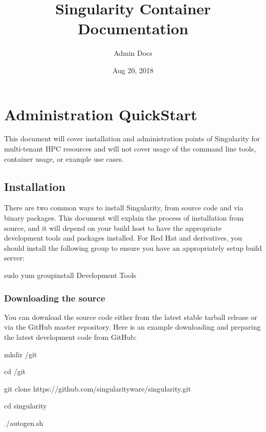\documentclass[letterpaper,10pt,english]{sphinxmanual}
\title{Singularity Container Documentation}
\date{Aug 20, 2018}
\author{Admin Docs}
\begin{document}
\maketitle
\sphinxtableofcontents
{}\label{\detokenize{index::doc}}



\chapter{Administration QuickStart}
\label{\detokenize{admin_quickstart:administration-quickstart}}\label{\detokenize{admin_quickstart::doc}}
This document will cover installation and administration points of
Singularity for multi-tenant HPC resources and will not cover usage of
the command line tools, container usage, or example use cases.


\section{Installation}
\label{\detokenize{admin_quickstart:installation}}
There are two common ways to install Singularity, from source code and
via binary packages. This document will explain the process of
installation from source, and it will depend on your build host to have
the appropriate development tools and packages installed. For Red Hat
and derivatives, you should install the following  group to ensure you
have an appropriately setup build server:

%
\begin{sphinxVerbatim}[commandchars=\\\{\}]
\PYGZdl{} sudo yum groupinstall \PYGZdq{}Development Tools\PYGZdq{}
\end{sphinxVerbatim}


\subsection{Downloading the source}
\label{\detokenize{admin_quickstart:downloading-the-source}}
You can download the source code either from the latest stable tarball
release or via the GitHub master repository. Here is an example
downloading and preparing the latest development code from GitHub:

%
\begin{sphinxVerbatim}[commandchars=\\\{\}]
\PYGZdl{} mkdir \PYGZti{}/git

\PYGZdl{} cd \PYGZti{}/git

\PYGZdl{} git clone https://github.com/singularityware/singularity.git

\PYGZdl{} cd singularity

\PYGZdl{} ./autogen.sh
\end{sphinxVerbatim}
\end{document}

